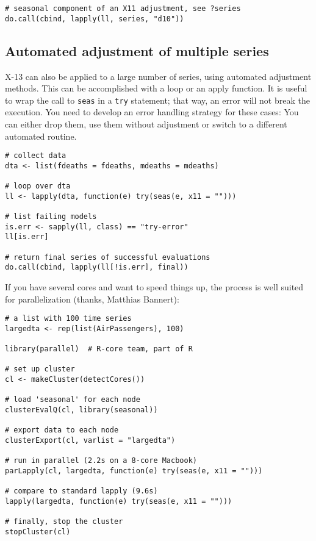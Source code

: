 \begin{verbatim}
# seasonal component of an X11 adjustment, see ?series
do.call(cbind, lapply(ll, series, "d10"))
\end{verbatim}

\subsection{Automated adjustment of multiple
series}\label{automated-adjustment-of-multiple-series}

X-13 can also be applied to a large number of series, using automated
adjustment methods. This can be accomplished with a loop or an apply
function. It is useful to wrap the call to \texttt{seas} in a
\texttt{try} statement; that way, an error will not break the execution.
You need to develop an error handling strategy for these cases: You can
either drop them, use them without adjustment or switch to a different
automated routine.

\begin{verbatim}
# collect data 
dta <- list(fdeaths = fdeaths, mdeaths = mdeaths)

# loop over dta
ll <- lapply(dta, function(e) try(seas(e, x11 = "")))

# list failing models
is.err <- sapply(ll, class) == "try-error"
ll[is.err]

# return final series of successful evaluations
do.call(cbind, lapply(ll[!is.err], final))
\end{verbatim}

If you have several cores and want to speed things up, the process is
well suited for parallelization (thanks, Matthias Bannert):

\begin{verbatim}
# a list with 100 time series
largedta <- rep(list(AirPassengers), 100)

library(parallel)  # R-core team, part of R 

# set up cluster
cl <- makeCluster(detectCores())

# load 'seasonal' for each node
clusterEvalQ(cl, library(seasonal))

# export data to each node
clusterExport(cl, varlist = "largedta")

# run in parallel (2.2s on a 8-core Macbook)
parLapply(cl, largedta, function(e) try(seas(e, x11 = "")))

# compare to standard lapply (9.6s)
lapply(largedta, function(e) try(seas(e, x11 = "")))

# finally, stop the cluster
stopCluster(cl)
\end{verbatim}

